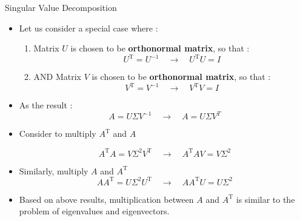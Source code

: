 \begin{frame}[t]{Singular Value Decomposition}
	\begin{itemize}
		\item Let us consider a special case where :
		\begin{enumerate}
			\item Matrix $U$ is chosen to be \textbf{orthonormal matrix}, so that :
			\begin{equation*}
                U^{\text{T}} = U^{-1}
				\quad \rightarrow \quad
                U^{\text{T}} U = I
			\end{equation*}
			\item AND Matrix $V$ is chosen to be \textbf{orthonormal matrix}, so that :
			\begin{equation*}
                V^{\text{T}} = V^{-1}
				\quad \rightarrow \quad
                V^{\text{T}} V = I
			\end{equation*}
		\end{enumerate}
		\item As the result :
		\begin{equation*}
			A = U  \Sigma V^{-1} \quad \rightarrow \quad A = U  \Sigma V^{T}
		\end{equation*}
	
    \item Consider to multiply $A^{\text{T}}$ and $A$

        \begin{equation*}
            A^{\text{T}} A = V \Sigma^2 V^{\text{T}} \quad \rightarrow \quad
            A^{\text{T}} A V = V \Sigma^2 
		\end{equation*}

    \item Similarly, multiply $A$ and $A^{\text{T}}$ 
		\begin{equation*}
            A A^{\text{T}} = U \Sigma^2 U^{\text{T}} \quad \rightarrow \quad A
            A^{\text{T}} U = U \Sigma^2 
		\end{equation*}

    \item Based on above results, multiplication between $A$ and $A^{\text{T}}$
        is similar to the problem of eigenvalues and eigenvectors. 

	\end{itemize}
\end{frame}

